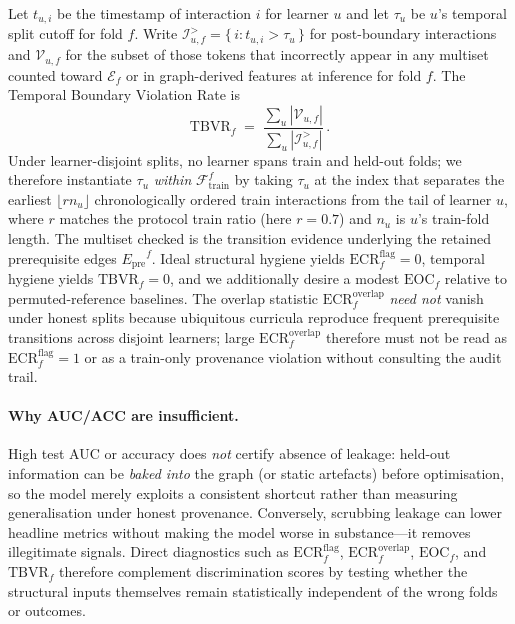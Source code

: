 \documentclass[runningheads]{llncs}
\newcommand{\Epre}{\ensuremath{E_{\text{pre}}}}
\begin{document}
Let $t_{u,i}$ be the timestamp of interaction $i$ for learner $u$ and
let $\tau_u$ be $u$'s temporal split cutoff for fold $f$. Write
$\mathcal{I}_{u,f}^{>}=\{\, i : t_{u,i}>\tau_u \,\}$ for post-boundary
interactions and $\mathcal{V}_{u,f}$ for the subset of those tokens that
incorrectly appear in any multiset counted toward $\mathcal{E}_f$ or in
graph-derived features at inference for fold $f$. The Temporal
Boundary Violation Rate is
\begin{equation}
\mathrm{TBVR}_f \;=\;
\frac{\sum_u |\mathcal{V}_{u,f}|}{\sum_u |\mathcal{I}_{u,f}^{>}|}\,.
\label{eq:tbvr}
\end{equation}
Under learner-disjoint splits, no learner spans train and held-out folds;
we therefore instantiate $\tau_u$ \emph{within}
$\mathcal{F}_{\text{train}}^f$ by taking $\tau_u$ at the index that
separates the earliest $\lfloor r n_u\rfloor$ chronologically ordered
train interactions from the tail of learner $u$, where $r$ matches the
protocol train ratio (here $r{=}0.7$) and $n_u$ is $u$'s train-fold length.
The multiset checked is the transition evidence underlying the retained
prerequisite edges $\Epre^f$.
Ideal structural hygiene yields $\mathrm{ECR}^{\mathrm{flag}}_f{=}0$, temporal hygiene yields $\mathrm{TBVR}_f{=}0$, and we additionally desire a modest $\mathrm{EOC}_f$ relative to permuted-reference baselines.
The overlap statistic $\mathrm{ECR}^{\mathrm{overlap}}_f$ \emph{need not} vanish under honest splits because ubiquitous curricula reproduce frequent prerequisite transitions across disjoint learners; large $\mathrm{ECR}^{\mathrm{overlap}}_f$ therefore must not be read as $\mathrm{ECR}^{\mathrm{flag}}_f{=}1$ or as a train-only provenance violation without consulting the audit trail.

\paragraph{Why AUC/ACC are insufficient.}
High test AUC or accuracy does \emph{not} certify absence of leakage:
held-out information can be \emph{baked into} the graph (or static
artefacts) before optimisation, so the model merely exploits a
consistent shortcut rather than measuring generalisation under honest
provenance. Conversely, scrubbing leakage can lower headline metrics
without making the model worse in substance---it removes illegitimate
signals. Direct diagnostics such as $\mathrm{ECR}^{\mathrm{flag}}_f$, $\mathrm{ECR}^{\mathrm{overlap}}_f$, $\mathrm{EOC}_f$,
and $\mathrm{TBVR}_f$ therefore complement discrimination scores by
testing whether the structural inputs themselves remain statistically
independent of the wrong folds or outcomes.
\end{document}
